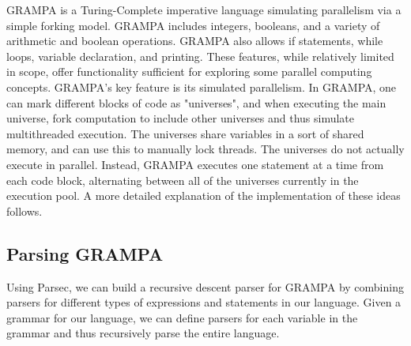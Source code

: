 \documentclass[numbers]{sigplanconf}
\begin{document}
GRAMPA is a Turing-Complete imperative language simulating parallelism via a simple forking model. GRAMPA includes integers, booleans, and a variety of arithmetic and boolean operations. GRAMPA also allows if statements, while loops, variable declaration, and printing. These features, while relatively limited in scope, offer functionality sufficient for exploring some parallel computing concepts. GRAMPA's key feature is its simulated parallelism. In GRAMPA, one can mark different blocks of code as "universes", and when executing the main universe, fork computation to include other universes and thus simulate multithreaded execution. The universes share variables in a sort of shared memory, and can use this to manually lock threads. The universes do not actually execute in parallel. Instead, GRAMPA executes one statement at a time from each code block, alternating between all of the universes currently in the execution pool. A more detailed explanation of the implementation of these ideas follows.

\subsection{Parsing GRAMPA}

Using Parsec, we can build a recursive descent parser for GRAMPA by combining parsers for different types of expressions and statements in our language. Given a grammar for our language, we can define parsers for each variable in the grammar and thus recursively parse the entire language.
\end{document}
